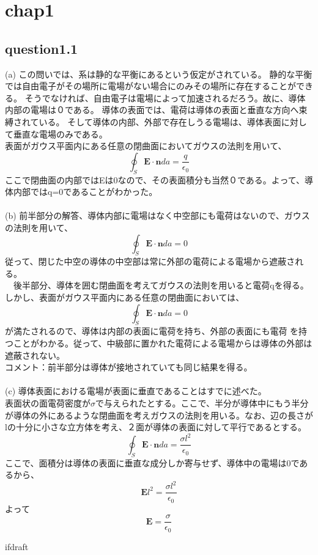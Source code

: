 \documentclass{jsarticle}
\begin{document}
\fi
\section  {chap1}
\subsection {question1.1}
(a) この問いでは、系は静的な平衡にあるという仮定がされている。
静的な平衡では自由電子がその場所に電場がない場合にのみその場所に存在することができる。
そうでなければ、自由電子は電場によって加速されるだろう。故に、導体内部の電場は０である。
導体の表面では、電荷は導体の表面と垂直な方向へ束縛されている。
そして導体の内部、外部で存在しうる電場は、導体表面に対して垂直な電場のみである。
\\
表面がガウス平面内にある任意の閉曲面においてガウスの法則を用いて、
\[
  \oint_S \mathbf{E} \cdot \mathbf{n} da = \frac{q}{\epsilon_0}
\]
ここで閉曲面の内部ではEは0なので、その表面積分も当然０である。よって、導体内部ではq=0であることがわかった。\\\\
(b) 前半部分の解答、導体内部に電場はなく中空部にも電荷はないので、ガウスの法則を用いて、
\[
  \oint_S \mathbf{E} \cdot \mathbf{n} da = 0
\]
従って、閉じた中空の導体の中空部は常に外部の電荷による電場から遮蔽される。
\\
　後半部分、導体を囲む閉曲面を考えてガウスの法則を用いると電荷qを得る。しかし、表面がガウス平面内にある任意の閉曲面においては、
\[
  \oint_S \mathbf{E} \cdot \mathbf{n} da = 0
\]
が満たされるので、導体は内部の表面に電荷を持ち、外部の表面にも電荷
を持つことがわかる。従って、中級部に置かれた電荷による電場からは導体の外部は遮蔽されない。
\\
コメント：前半部分は導体が接地されていても同じ結果を得る。
\\
\\
(c) 導体表面における電場が表面に垂直であることはすでに述べた。\\
表面状の面電荷密度が$\sigma$で与えられたとする。ここで、半分が導体中にもう半分が導体の外にあるような閉曲面を考えガウスの法則を用いる。なお、辺の長さがlの十分に小さな立方体を考え、２面が導体の表面に対して平行であるとする。
\[
  \oint_S \mathbf{E} \cdot \mathbf{n} da = \frac{ \sigma l^2 }{\epsilon_0}
\]
ここで、面積分は導体の表面に垂直な成分しか寄与せず、導体中の電場は0であるから、
\[
  \mathbf{E} l^2 = \frac{ \sigma l^2 }{\epsilon_0}
\]
よって\[
  \mathbf{E} = \frac{ \sigma}{\epsilon_0}
\]
\newpage


\expandafter\ifx\csname ifdraft\endcsname\relax
  
\end{document}
